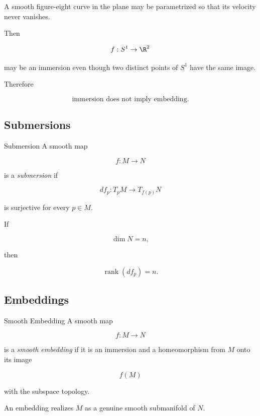 A smooth figure-eight curve in the plane may be parametrized so that its
velocity never vanishes.

Then

\[
f:S^1\to\R^2
\]

may be an immersion even though two distinct points of \(S^1\) have the same
image.

Therefore

\[
\boxed{
\text{immersion does not imply embedding}.
}
\]

\subsection{Submersions}
\label{subsec:submersions}

\begin{definitionbox}{Submersion}
A smooth map

\[
f:M\to N
\]

is a \emph{submersion} if

\[
\boxed{
df_p:T_pM\to T_{f(p)}N
}
\]

is surjective for every \(p\in M\).
\end{definitionbox}

If

\[
\dim N=n,
\]

then

\[
\boxed{
\operatorname{rank}(df_p)=n.
}
\]

\subsection{Embeddings}
\label{subsec:differential-topology-embeddings}

\begin{definitionbox}{Smooth Embedding}
A smooth map

\[
f:M\to N
\]

is a \emph{smooth embedding} if it is an immersion and a homeomorphism from
\(M\) onto its image

\[
f(M)
\]

with the subspace topology.
\end{definitionbox}

An embedding realizes \(M\) as a genuine smooth submanifold of \(N\).

